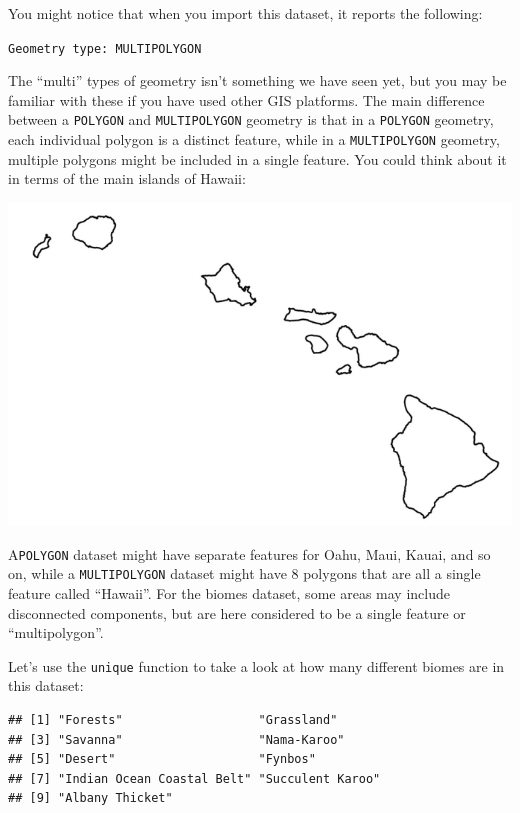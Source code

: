 \documentclass[
]{book}
\newenvironment{Shaded}{\begin{snugshade}}{\end{snugshade}}
\newcommand{\CommentTok}[1]{\textcolor[rgb]{0.56,0.35,0.01}{\textit{#1}}}
\newcommand{\FunctionTok}[1]{\textcolor[rgb]{0.00,0.00,0.00}{#1}}
\newcommand{\NormalTok}[1]{#1}
\newcommand{\SpecialCharTok}[1]{\textcolor[rgb]{0.00,0.00,0.00}{#1}}
\begin{document}
You might notice that when you import this dataset, it reports the following:

\texttt{Geometry\ type:\ MULTIPOLYGON}

The ``multi'' types of geometry isn't something we have seen yet, but you may be familiar with these if you have used other GIS platforms. The main difference between a \texttt{POLYGON} and \texttt{MULTIPOLYGON} geometry is that in a \texttt{POLYGON} geometry, each individual polygon is a distinct feature, while in a \texttt{MULTIPOLYGON} geometry, multiple polygons might be included in a single feature. You could think about it in terms of the main islands of Hawaii:

\includegraphics{hawaii.png}

A\texttt{POLYGON} dataset might have separate features for Oahu, Maui, Kauai, and so on, while a \texttt{MULTIPOLYGON} dataset might have 8 polygons that are all a single feature called ``Hawaii''. For the biomes dataset, some areas may include disconnected components, but are here considered to be a single feature or ``multipolygon''.

Let's use the \texttt{unique} function to take a look at how many different biomes are in this dataset:

\begin{Shaded}
\end{Shaded}

\begin{verbatim}
## [1] "Forests"                   "Grassland"                
## [3] "Savanna"                   "Nama-Karoo"               
## [5] "Desert"                    "Fynbos"                   
## [7] "Indian Ocean Coastal Belt" "Succulent Karoo"          
## [9] "Albany Thicket"
\end{verbatim}
\end{document}
